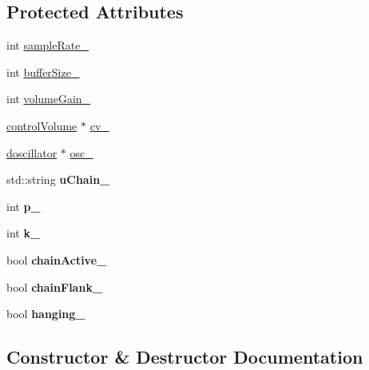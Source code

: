 \subsection*{Protected Attributes}
\begin{DoxyCompactItemize}
\item 
int \hyperlink{classdspSystem_a1021bd767ff7541a07638f8a5e0b9a3e}{sample\+Rate\+\_\+}
\item 
int \hyperlink{classdspSystem_a0875e23a2ff73938f0f44ee6c0ef88dd}{buffer\+Size\+\_\+}
\item 
int \hyperlink{classdspSystem_a2385f59dd33cffc8f3ef91c159cf8290}{volume\+Gain\+\_\+}
\item 
\hyperlink{classcontrolVolume}{control\+Volume} $\ast$ \hyperlink{classdspSystem_ab2b833fc01ee4ca4ba12ee9b1682b03f}{cv\+\_\+}
\item 
\hyperlink{classdoscillator}{doscillator} $\ast$ \hyperlink{classdspSystem_a47e78629937cbd18a4368f81503e1714}{osc\+\_\+}
\item 
\mbox{\label{classdspSystem_aa10b32a1408ede7a2142517c937bd2a8}} 
std\+::string {\bfseries u\+Chain\+\_\+}
\item 
\mbox{\label{classdspSystem_ac875b7f4890743b9b0119051fc19ed7a}} 
int {\bfseries p\+\_\+}
\item 
\mbox{\label{classdspSystem_a0595f2839b425efa43491a1827176295}} 
int {\bfseries k\+\_\+}
\item 
\mbox{\label{classdspSystem_a559fc273913bfccf1c71816182493017}} 
bool {\bfseries chain\+Active\+\_\+}
\item 
\mbox{\label{classdspSystem_ae324ad2889e7a97654df5cbb198be5d5}} 
bool {\bfseries chain\+Flank\+\_\+}
\item 
\mbox{\label{classdspSystem_a3d0078cdfe951fd639bea1783f940972}} 
bool {\bfseries hanging\+\_\+}
\end{DoxyCompactItemize}


\subsection{Constructor \& Destructor Documentation}
\mbox{\label{classdspSystem_a3b40bd9107e62a5dc47cab7a8acd4831}} 
